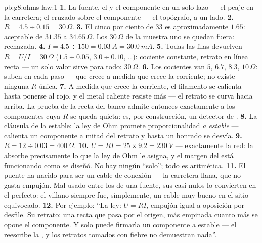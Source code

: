 \begin{solution}{pb:g8:ohms-law:1}
\textbf{1.} La fuente, el  y el componente en un solo
lazo  --- el peaje en la carretera; el
 cruzado sobre el componente --- el topógrafo, a un
lado.
\textbf{2.} $R = 4.5 \div 0.15 = 30\,\Omega$.
\textbf{3.} El cinco por ciento de $33$ es aproximadamente $1.65$:
aceptable de $31.35$ a $34.65\,\Omega$. Los $30\,\Omega$ de la muestra
uno se quedan fuera: rechazada.
\textbf{4.} $I = 4.5 \div 150 = \qty{0.03}{A} = \qty{30.0}{mA}$.
\textbf{5.} Todas las filas devuelven $R = U/I = 30\,\Omega$ ($1.5 \div
0.05$, $3.0 \div 0.10$, \dots): cociente constante, retrato en línea
recta --- un solo valor sirve para todo: $30\,\Omega$.
\textbf{6.} Los cocientes van $5$, $6.7$, $8.3$, $10\,\Omega$: suben en
cada paso ---  que crece a medida que crece la
corriente; no existe ninguna $R$ única.
\textbf{7.} A medida que crece la corriente, el filamento se
calienta hasta ponerse al rojo, y el metal caliente resiste más
--- el retrato se curva hacia arriba. La prueba de la recta del banco
admite entonces exactamente a los componentes cuya $R$ se queda quieta:
es, por construcción, un detector de .
\textbf{8.} La cláusula de la  estable: la ley de Ohm
promete proporcionalidad \emph{a  estable} ---
calienta un componente a mitad del retrato y hasta un
 honrado se desvía.
\textbf{9.} $R = 12 \div 0.03 = 400\,\Omega$.
\textbf{10.} $U = R I = 25 \times 9.2 = \qty{230}{V}$ --- exactamente
la red: la  absorbe precisamente lo que la ley de Ohm le
asigna, y el margen del  está funcionando como se diseñó.
No hay ningún ``solo''; todo es aritmética.
\textbf{11.} El puente ha nacido para ser un cable de conexión --- la
carretera llana, que no gasta empujón. Mal usado entre los  de
una fuente, sus  casi nulos lo convierten en el
 perfecto: el villano siempre fue, simplemente, un
cable muy bueno en el sitio equivocado.
\textbf{12.} Por ejemplo: ``La ley: $U = R I$, empujón igual a
oposición por desfile. Su retrato: una recta que pasa por el origen,
más empinada cuanto más se opone el componente. Y solo puede firmarla
un componente a  estable --- el 
reescribe la , y los retratos tomados con fiebre no
demuestran nada''.
\end{solution}
